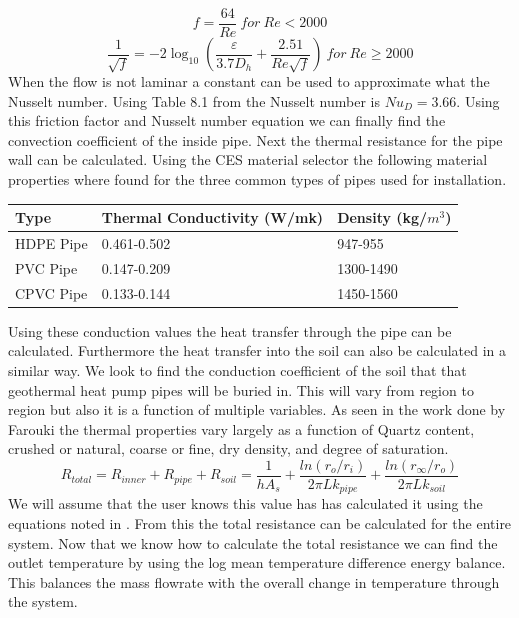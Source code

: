 %
\begin{equation}
    f = \frac{64}{Re}\ for\ Re < 2000
\end{equation}
\begin{equation}
    \frac { 1 }{ \sqrt { f }  } =-2\log _{ 10 } \left( \frac { \varepsilon  }{ 3.7D_{ h } } +\frac { 2.51 }{ { Re }\sqrt { f }  }  \right)\ for\ Re \geq 2000
\end{equation}
%
When the flow is not laminar a constant can be used to approximate what the Nusselt number. Using Table 8.1 from \cite{bergman2011fundamentals} the Nusselt number is ${ N }u_{ D }=3.66$. Using this friction factor and Nusselt number equation we can finally find the convection coefficient of the inside pipe. Next the thermal resistance for the pipe wall can be calculated. Using the CES material selector \cite{ces} the following material properties where found for the three common types of pipes used for installation.
%
\begin{table}[H]
\centering
\begin{tabular}{lll}
Type       & Thermal Conductivity (W/mk) & Density (kg/$m^3$) \\ \hline
HDPE Pipe  & 0.461-0.502                 & 947-955                          \\
PVC Pipe   & 0.147-0.209                 & 1300-1490                        \\
CPVC Pipe  & 0.133-0.144                 & 1450-1560                       
\end{tabular}
\end{table}
%
\noindent
Using these conduction values the heat transfer through the pipe can be calculated. Furthermore the heat transfer into the soil can also be calculated in a similar way. We look to find the conduction coefficient of the soil that that geothermal heat pump pipes will be buried in. This will vary from region to region but also it is a function of multiple variables. As seen in the work done by Farouki \cite{farouki1981thermal} the thermal properties vary largely as a function of Quartz content, crushed or natural, coarse or fine, dry density, and degree of saturation. %
\begin{equation}
    { R }_{ total }={ R }_{ inner }+{ R }_{ pipe }+{ R }_{ soil }=\frac { 1 }{ h{ A }_{ s } } +\frac { ln({ { r }_{ o } }/{ { r }_{ i } }) }{ { 2\pi Lk }_{ pipe } } +\frac { ln({ { r }_{ \infty  } }/{ { r }_{ o } }) }{ { 2\pi Lk }_{ soil } } 
\end{equation}
%
We will assume that the user knows this value has has calculated it using the equations noted in \cite{farouki1981thermal}. From this the total resistance can be calculated for the entire system. Now that we know how to calculate the total resistance we can find the outlet temperature by using the log mean temperature difference energy balance. This balances the mass flowrate with the overall change in temperature through the system.
